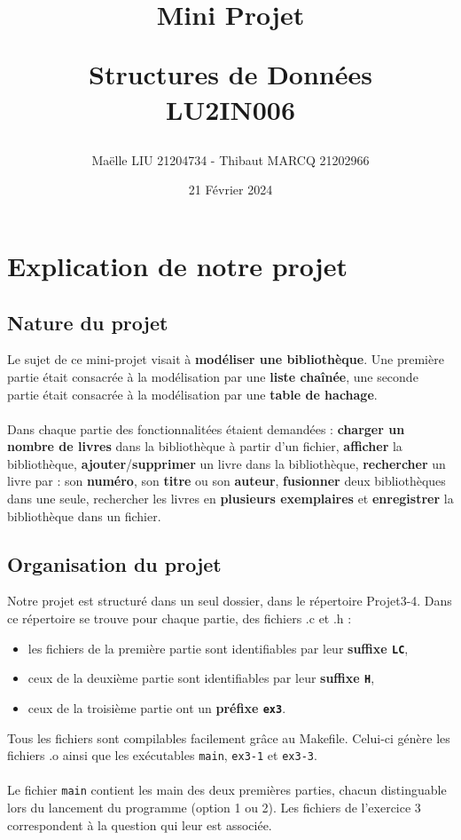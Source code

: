 \documentclass[12pt]{extarticle}
\title{\textbf{Mini Projet} 

Structures de Données\\
LU2IN006 }
\author{Maëlle LIU 21204734 - Thibaut MARCQ 21202966}
\date{21 Février 2024}
\begin{document}
\maketitle
\renewcommand*\contentsname{Sommaire}
\tableofcontents

\newpage
\section*{Explication de notre projet}
\subsection*{Nature du projet}
Le sujet de ce mini-projet visait à \textbf{modéliser une bibliothèque}. Une première partie était consacrée à la modélisation par une \textbf{liste chaînée}, une seconde partie était consacrée à la modélisation par une \textbf{table de hachage}. 
\\ \\
Dans chaque partie des fonctionnalitées étaient demandées : \textbf{charger un nombre de livres} dans la bibliothèque à partir d'un fichier, \textbf{afficher} la bibliothèque, \textbf{ajouter}/\textbf{supprimer} un livre dans la bibliothèque, \textbf{rechercher} un livre par : son \textbf{numéro}, son \textbf{titre} ou son \textbf{auteur}, \textbf{fusionner} deux bibliothèques dans une seule, rechercher les livres en \textbf{plusieurs exemplaires} et \textbf{enregistrer} la bibliothèque dans un fichier.
\subsection*{Organisation du projet}
Notre projet est structuré dans un seul dossier, dans le répertoire Projet3-4. Dans ce répertoire se trouve pour chaque partie, des fichiers .c et .h :
\begin{itemize}[label=-]
    \item les fichiers de la première partie sont identifiables par leur \textbf{suffixe \texttt{LC}},
    \item ceux de la deuxième partie sont identifiables par leur \textbf{suffixe \texttt{H}},
    \item ceux de la troisième partie ont un \textbf{préfixe \texttt{ex3}}.
\end{itemize}
Tous les fichiers sont compilables facilement grâce au Makefile. Celui-ci génère les fichiers .o ainsi que les exécutables \texttt{main}, \texttt{ex3-1} et \texttt{ex3-3}.
\\ \\
Le fichier \texttt{main} contient les main des deux premières parties, chacun distinguable lors du lancement du programme (option 1 ou 2). Les fichiers de l'exercice 3 correspondent à la question qui leur est associée.
\end{document}
